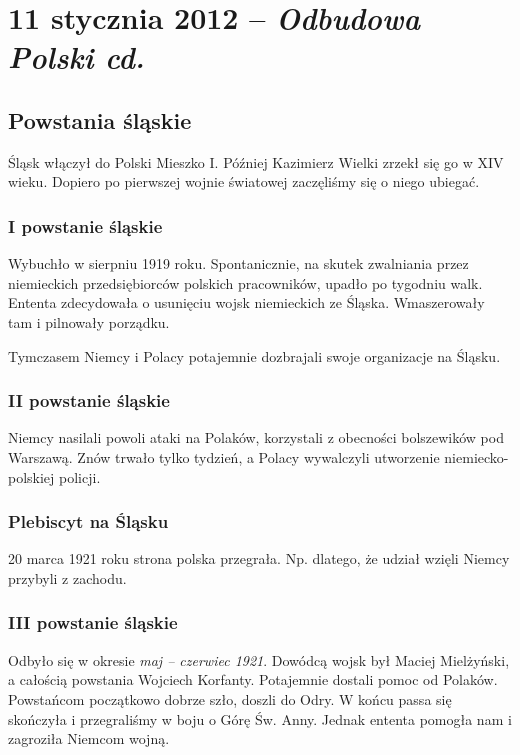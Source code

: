 \documentclass [a4paper, 11pt, oneside]{book}
\begin{document}
\chapter{11 stycznia 2012 -- \textit{Odbudowa Polski cd.}} %
\label{cha:11_stycznia_2012_textit}
    \section{Powstania śląskie} %
    \label{sec:powstania_l_skie}
        Śląsk włączył do Polski Mieszko I. Później Kazimierz Wielki zrzekł się go w XIV wieku. Dopiero po pierwszej wojnie światowej zaczęliśmy się o niego ubiegać.
        \subsection{I powstanie śląskie} %
        \label{sub:i_powstanie_l_skie}
            Wybuchło w sierpniu 1919 roku. Spontanicznie, na skutek zwalniania przez niemieckich przedsiębiorców polskich pracowników, upadło po tygodniu walk. Ententa zdecydowała o usunięciu wojsk niemieckich ze Śląska. Wmaszerowały tam i pilnowały porządku.

        Tymczasem Niemcy i Polacy potajemnie dozbrajali swoje organizacje na Śląsku.
        \subsection{II powstanie śląskie} %
        \label{sub:ii_powstanie_l_skie}
            Niemcy nasilali powoli ataki na Polaków, korzystali z obecności bolszewików pod Warszawą. Znów trwało tylko tydzień, a Polacy wywalczyli utworzenie niemiecko-polskiej policji.
        \subsection{Plebiscyt na Śląsku} %
        \label{sub:plebiscyt_na_l_sku}
            20 marca 1921 roku strona polska przegrała. Np. dlatego, że udział wzięli Niemcy przybyli z zachodu.
        \subsection{III powstanie śląskie} %
        \label{sub:iii_powstanie_l_skie}
            Odbyło się w okresie \textit{maj -- czerwiec 1921}. Dowódcą wojsk był Maciej Mielżyński, a całością powstania Wojciech Korfanty. Potajemnie dostali pomoc od Polaków. Powstańcom początkowo dobrze szło, doszli do Odry. W końcu passa się skończyła i przegraliśmy w boju o Górę Św. Anny. Jednak ententa pomogła nam i zagroziła Niemcom wojną.
\end{document}
